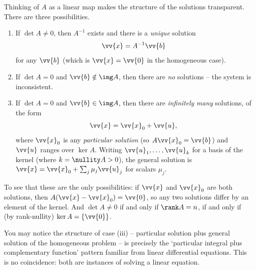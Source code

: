 Thinking of $A$ as a linear map makes the structure of the solutions transparent. There are three possibilities.
\begin{enumerate}[label=(\roman*)]
	\item If $\det A \neq 0$, then $A^{-1}$ exists and there is a \emph{unique} solution
	$$
	\vv{x} = A^{-1}\vv{b}
	$$
	for any $\vv{b}$ (which is $\vv{x} = \vv{0}$ in the homogeneous case).
	\item If $\det A = 0$ and $\vv{b} \notin \img A$, then there are \emph{no} solutions -- the system is inconsistent.
	\item If $\det A = 0$ and $\vv{b} \in \img A$, then there are \emph{infinitely many} solutions, of the form
	$$
	\vv{x} = \vv{x}_0 + \vv{u},
	$$
	where $\vv{x}_0$ is any \emph{particular solution} (so $A \vv{x}_0 = \vv{b}$) and $\vv{u}$ ranges over $\ker A$. Writing $\vv{u}_1, \dots, \vv{u}_k$ for a basis of the kernel (where $k = \nullity A > 0$), the general solution is $\vv{x} = \vv{x}_0 + \sum_{j} \mu_j \vv{u}_j$ for scalars $\mu_j$.
\end{enumerate}
To see that these are the only possibilities: if $\vv{x}$ and $\vv{x}_0$ are both solutions, then $A(\vv{x} - \vv{x}_0) = \vv{0}$, so any two solutions differ by an element of the kernel. And $\det A \neq 0$ if and only if $\rank A = n$, if and only if (by rank-nullity) $\ker A = \{\vv{0}\}$.

You may notice the structure of case (iii) -- particular solution plus general solution of the homogeneous problem -- is precisely the `particular integral plus complementary function' pattern familiar from linear differential equations. This is no coincidence: both are instances of solving a linear equation.

